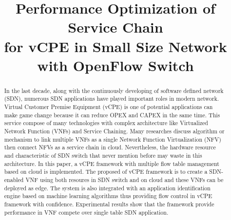 \documentclass[journal]{IEEEtran}
\begin{document}
\title{Performance Optimization of Service Chain \\ for vCPE in Small Size Network \\ with OpenFlow Switch}

\author{

}


\maketitle

\begin{abstract}
In the last decade, along with the continuously developing of software defined network (SDN), numerous SDN applications have played important roles in modern network. Virtual Customer Premise Equipment (vCPE) is one of potential applications can make game change because it can reduce OPEX and CAPEX in the same time. This service compose of many technologies with complex architecture like Virtualized Network Function (VNFs) and Service Chaining. Many researches discuss algorithm or mechanism to link multiple VNFs as a single Network Function Virtualization (NFV) then connect NFVs as a service chain in cloud. Nevertheless, the hardware resource and characteristic of SDN switch that never mention before may waste in this architecture. In this paper, a vCPE framework with multiple flow table management based on cloud is implemented. The proposed of vCPE framework is to create a SDN-enabled VNF using both resoures in SDN switch and on cloud and these VNFs can be deployed as edge. The system is also integrated with an application identification engine based on machine learning algorithms thus providing flow control in vCPE framework with confidence. Experimental results show that the framework provide performance in VNF compete over single table SDN application.
\end{abstract}
\end{document}
